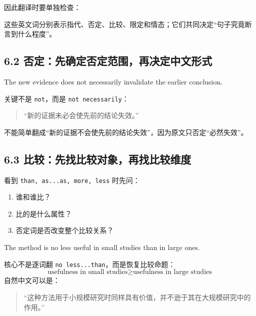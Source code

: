 \documentclass[11pt,a4paper]{ctexart}
\begin{document}
因此翻译时要单独检查：
\begin{center}
\end{center}
这些英文词分别表示指代、否定、比较、限定和情态；它们共同决定“句子究竟断言到什么程度”。

\subsection{6.2 否定：先确定否定范围，再决定中文形式}
\begin{eng}[例 15]
The new evidence does not necessarily invalidate the earlier conclusion.
\end{eng}
关键不是 \texttt{not}，而是 \texttt{not necessarily}：
\begin{quote}
“新的证据未必会使先前的结论失效。”
\end{quote}
不能简单翻成“新的证据不会使先前的结论失效”，因为原文只否定“必然失效”。

\subsection{6.3 比较：先找比较对象，再找比较维度}
看到 \texttt{than, as...as, more, less} 时先问：
\begin{enumerate}
  \item 谁和谁比？
  \item 比的是什么属性？
  \item 否定词是否改变整个比较关系？
\end{enumerate}

\begin{eng}[例 16]
The method is no less useful in small studies than in large ones.
\end{eng}
核心不是逐词翻 \texttt{no less...than}，而是恢复比较命题：
\[
\text{usefulness in small studies}
\geq
\text{usefulness in large studies}
\]
自然中文可以是：
\begin{quote}
“这种方法用于小规模研究时同样具有价值，并不逊于其在大规模研究中的作用。”
\end{quote}
\end{document}
